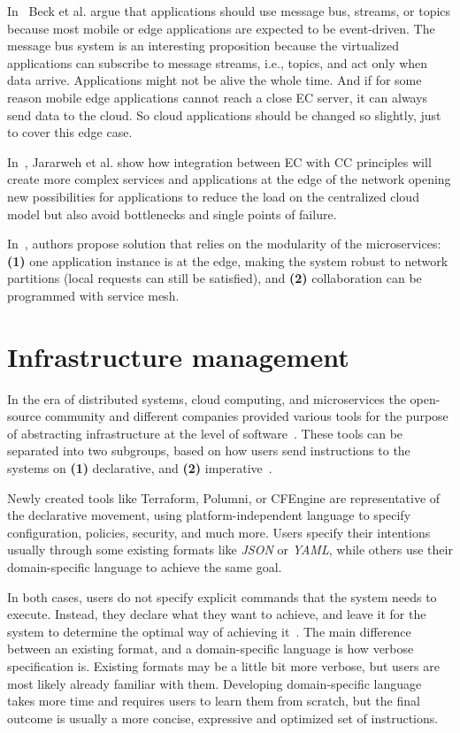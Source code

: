 In~\cite{inproceedingsBeck} Beck et al. argue that applications should use message bus, streams, or topics because most mobile or edge applications are expected to be event-driven. The message bus system is an interesting proposition because the virtualized applications can subscribe to message streams, i.e., topics, and act only when data arrive. Applications might not be alive the whole time. And if for some reason mobile edge applications cannot reach a close EC server, it can always send data to the cloud. So cloud applications should be changed so slightly, just to cover this edge case.

In~\cite{JararwehDAAAB16}, Jararweh et al. show how integration between EC with CC principles will create more complex services and applications at the edge of the network opening new possibilities for applications to reduce the load on the centralized cloud model but also avoid bottlenecks and single points of failure.

In~\cite{cherrueau}, authors propose solution that relies on the modularity of the microservices: \textbf{(1)} one application instance is at the edge, making the system robust to network partitions (local requests can still be satisfied), and \textbf{(2)} collaboration can be programmed with service mesh.
%
%
\section{Infrastructure management}\label{sec:infrastructure_management}
%
In the era of distributed systems, cloud computing, and microservices the open-source community and different companies provided various tools for the purpose of abstracting infrastructure at the level of software~\cite{RahmanMW19, Fitzgerald}. These tools can be separated into two subgroups, based on how users send instructions to the systems on \textbf{(1)} declarative, and \textbf{(2)} imperative~\cite{RahmanMW19}.

Newly created tools like Terraform, Polumni, or CFEngine are representative of the declarative movement, using platform-independent language to specify configuration, policies, security, and much more. Users specify their intentions usually through some existing formats like \emph{JSON} or \emph{YAML}, while others use their domain-specific language to achieve the same goal.

In both cases, users do not specify explicit commands that the system needs to execute. Instead, they declare what they want to achieve, and leave it for the system to determine the optimal way of achieving it~\cite{RahmanMW19}. The main difference between an existing format, and a domain-specific language is how verbose specification is. Existing formats may be a little bit more verbose, but users are most likely already familiar with them. Developing domain-specific language takes more time and requires users to learn them from scratch, but the final outcome is usually a more concise, expressive and optimized set of instructions.


